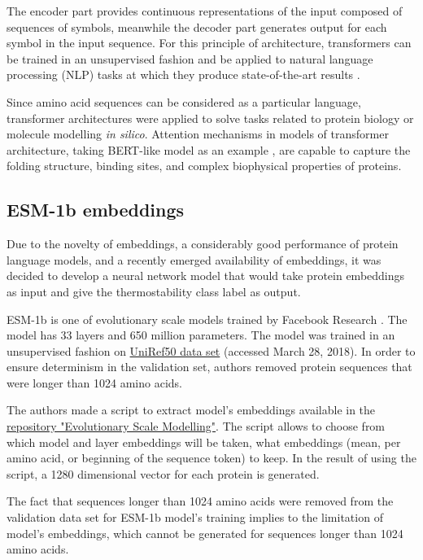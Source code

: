 \documentclass[12pt]{article}
\begin{document}
	The encoder part provides continuous representations of the input composed 
	of sequences of symbols, meanwhile the decoder part generates output for each 
	symbol in the input sequence. For this principle of architecture, transformers
	can be trained in an unsupervised fashion and be applied to natural language
	processing (NLP) tasks at which they produce state-of-the-art 
	results \cite{vig2019analyzing}.

	Since amino acid sequences can be considered as a particular language, 
	transformer architectures were applied to solve tasks related to protein 
	biology or molecule modelling \textit{in silico}. Attention mechanisms in 
	models of transformer architecture, taking BERT-like model as an example 
	\cite{vig2020bertology}, are capable to capture the folding structure, 
	binding sites, and complex biophysical properties of proteins.

	\subsection{ESM-1b embeddings}

	Due to the novelty of embeddings, a considerably good performance of
	protein language models, and a recently emerged availability of embeddings,
	it was decided to develop a neural network model that would take protein
	embeddings as input and give the thermostability class
	label as output.

	ESM-1b is one of evolutionary scale models trained by Facebook Research 
	\cite{rives2021biological}. The model has 33 layers and 650 million parameters. 
	The model was trained in an 
	unsupervised fashion on 
	\href{ftp://ftp.uniprot.org/pub/databases/uniprot/uniref/uniref50}{UniRef50 data set}
	(accessed March 28, 2018)\cite{suzek2015uniref}. In order 
	to ensure
	determinism in the validation set, authors removed protein sequences that
	were longer than 1024 amino acids. 

	The authors made a script to extract model's embeddings available in the 
	\href{https://github.com/facebookresearch/esm}{repository "Evolutionary Scale Modelling"}.
	The script allows to choose 
	from which model and layer embeddings will be taken, what embeddings 
	(mean, per amino acid, or beginning of the sequence token) to keep. In the
	result of using the script, a 1280 dimensional vector for each protein is 
	generated.
	
	The fact that sequences longer than 1024 amino acids were removed from the 
	validation data set for ESM-1b model's training implies to the limitation of 
	model's embeddings, which cannot be generated for sequences longer than 
	1024 amino acids.
\end{document}
